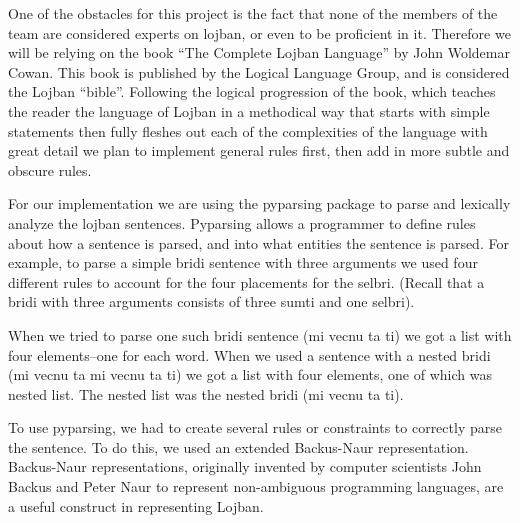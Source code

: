\documentclass[11pt,letterpaper]{article}
\begin{document}
	One of the obstacles for this project is the fact that none of the members of the team are considered experts on lojban, or even to be proficient in it. Therefore we will be relying on the book “The Complete Lojban Language” by John Woldemar Cowan. This book is published by the Logical Language Group, and is considered the Lojban “bible”. Following the logical progression of the book, which teaches the reader the language of Lojban in a methodical way that starts with simple statements then fully fleshes out each of the complexities of the language with great detail we plan to implement general rules first, then add in more subtle and obscure rules. 

	For our implementation we are using the pyparsing package to parse and lexically analyze the lojban sentences.  Pyparsing allows a programmer to define rules about how a sentence is parsed, and into what entities the sentence is parsed. For example, to parse a simple  bridi sentence with three arguments we used four different rules to account for the four placements for the selbri. (Recall that a bridi with three arguments consists of three sumti and one selbri). 

	When we tried to parse one such bridi sentence (mi vecnu ta ti) we got a list with four elements--one for each word. When we used a sentence with a nested bridi (mi vecnu ta mi vecnu ta ti) we got a list with four elements, one of which was nested list. The nested list was the nested bridi (mi vecnu ta ti). 

	To use pyparsing, we had to create several rules or constraints to correctly parse the sentence. To do this, we used an extended Backus-Naur representation. Backus-Naur representations, originally invented by computer scientists John Backus and Peter Naur to represent non-ambiguous programming languages, are a useful construct in representing Lojban.
\end{document}
